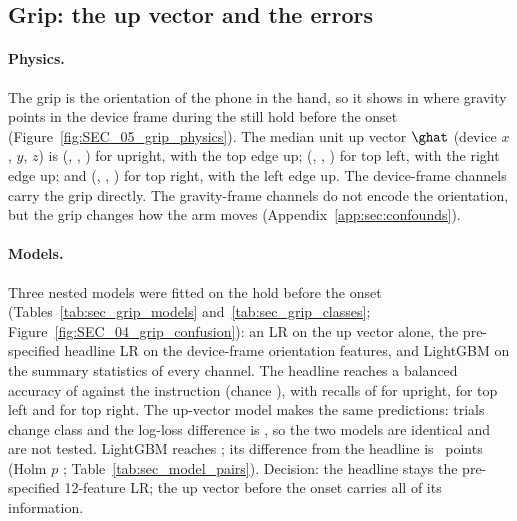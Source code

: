 \FloatBarrier
\subsection{Grip: the up vector and the errors}\label{app:sec:grip}

\paragraph{Physics.} The grip is the orientation of the phone in the hand, so it shows in where gravity points in
the device frame during the still hold before the onset (Figure~\ref{fig:SEC_05_grip_physics}). The median unit up
vector $\ghat$ (device $x$, $y$, $z$) is (, ,
) for upright, with the top edge up; (, ,
) for top left, with the right edge up; and (,
, ) for top right, with the left edge up. The device-frame
channels carry the grip directly. The gravity-frame channels do not encode the orientation, but the grip changes
how the arm moves (Appendix~\ref{app:sec:confounds}).

\paragraph{Models.} Three nested models were fitted on the hold before the onset (Tables~\ref{tab:sec_grip_models}
and~\ref{tab:sec_grip_classes}; Figure~\ref{fig:SEC_04_grip_confusion}): an LR on the up vector alone, the
pre-specified headline LR on the  device-frame orientation features, and LightGBM on the
summary statistics of every channel. The headline reaches a balanced accuracy of  against
the instruction (chance ), with recalls of  for upright,
 for top left and  for top right. The up-vector model makes
the same predictions:  trials change class and the log-loss difference is
, so the two models are identical and are not tested. LightGBM reaches
; its difference from the headline is ~points
(Holm $p$ ; Table~\ref{tab:sec_model_pairs}). Decision: the headline
stays the pre-specified 12-feature LR; the up vector before the onset carries all of its information.

